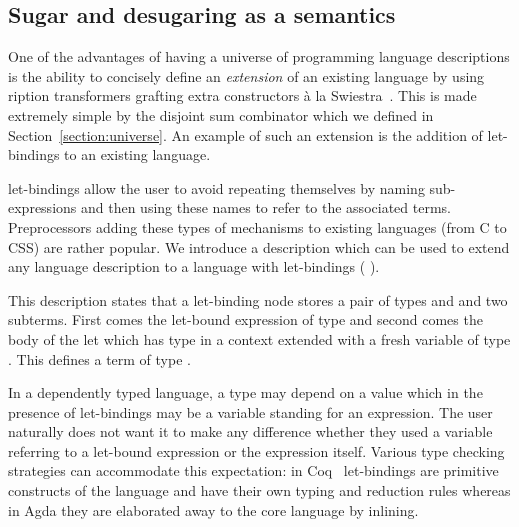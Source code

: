 \subsection{Sugar and desugaring as a semantics}\label{section:letbinding}

One of the advantages of having a universe of programming language
descriptions is the ability to concisely define an \emph{extension}
of an existing language by using ription transformers
grafting extra constructors à la Swiestra~\citeyear{swierstra_2008}.
This is made extremely simple by the disjoint sum combinator
 which we defined in Section~\ref{section:universe}.
An example of such an extension is the addition of let-bindings to
an existing language.

let-bindings allow the user to avoid repeating themselves by naming
sub-expressions and then using these names to refer to the associated
terms. Preprocessors adding these types of mechanisms to existing
languages (from C to CSS) are rather popular. We introduce a
description  which can be used to extend any language
description  to a language with let-bindings ( 
).

\noindent
\begin{minipage}{\textwidth}
\begin{minipage}[t]{0.45\textwidth}
\end{minipage}
\begin{minipage}[t]{0.45\textwidth}
\end{minipage}
\end{minipage}

This description states that a let-binding node stores a pair of types
\AB{$\sigma$} and \AB{$\tau$} and two subterms. First comes the let-bound
expression of type \AB{$\sigma$} and second comes the body of the let which
has type \AB{$\tau$} in a context extended with a fresh variable of type
\AB{$\sigma$}. This defines a term of type \AB{$\tau$}.

In a dependently typed language, a type may depend on a value which
in the presence of let-bindings may be a variable standing for an
expression. The user naturally does not want it to make any difference
whether they used a variable referring to a let-bound expression or
the expression itself. Various type checking strategies can accommodate
this expectation: in Coq~\cite{Coq:manual} let-bindings are primitive
constructs of the language and have their own typing and reduction
rules whereas in Agda they are elaborated away to the core language
by inlining.

